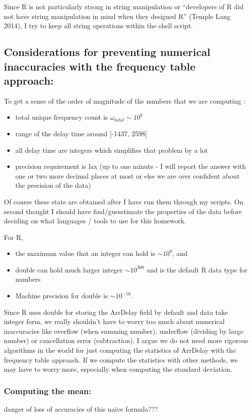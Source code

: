 \documentclass[letterpaper,10pt,english]{/usr/local/lib/python2.7/dist-packages/sphinx/texinputs/sphinxhowto}
\begin{document}
Since R is not particularly strong in string manipulation or
``developers of R did not have string manipulation in mind when they
designed R'' (Temple Lang 2014), I try to keep all string operations
within the shell script.\subsection{Considerations for preventing numerical inaccuracies with the frequency
table approach:}To get a sense of the order of magnitude of the numbers that we are
computing :

\begin{itemize}
\itemsep1pt\parskip0pt
\item
  total unique frequency count is $\omega_{total} \sim 10^8$
\item
  range of the delay time around {[}-1437, 2598{]}
\item
  all delay time are integers which simplifies that problem by a lot
\item
  precision requirement is lax (up to one minute - I will report the
  answer with one or two more decimal places at most or else we are over
  confident about the precision of the data)
\end{itemize}

Of course these stats are obtained after I have run them through my
scripts. On second thought I should have find/guesstimate the properties
of the data before deciding on what languages / tools to use for this
homework.

For R,

\begin{itemize}
\itemsep1pt\parskip0pt
\item
  the maximum value that an integer can hold is $\sim 10^9$, and
\item
  double can hold much larger integer $\sim 10^{308}$ and is the default
  R data type for numbers
\item
  Machine precision for double is $\sim 10^{-16}$.
\end{itemize}

Since R uses double for storing the ArrDelay field by default and data
take integer form, we really shouldn't have to worry too much about
numerical inaccuracies like overflow (when summing number), underflow
(dividing by large number) or cancellation error (subtraction). I argue
we do not need more rigorous algorithms in the world for just computing
the statistics of ArrDelay with the frequency table approach. If we
compute the statistics with other methods, we may have to worry more,
especially when computing the standard deviation.\subsubsection{Computing the mean:}danger of loss of accuracies of this naive formula???
\end{document}

